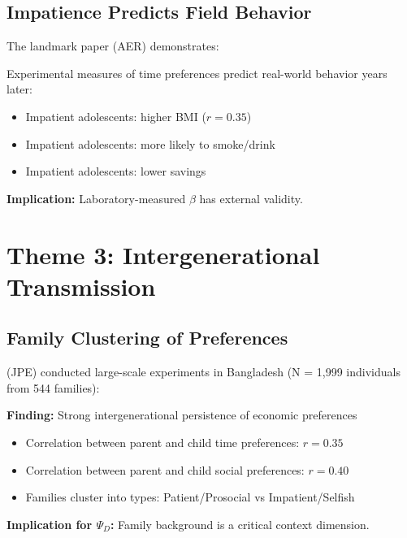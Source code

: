 \subsection{Impatience Predicts Field Behavior}

The landmark paper \citet{sutter2013impatience} (AER) demonstrates:

\begin{tcolorbox}[colback=blue!5!white, colframe=blue!75!black,
    title=Key Result SU-3: Lab-Field Validity]
Experimental measures of time preferences predict real-world behavior years later:
\begin{itemize}[nosep]
\item Impatient adolescents: higher BMI ($r = 0.35$)
\item Impatient adolescents: more likely to smoke/drink
\item Impatient adolescents: lower savings
\end{itemize}
\textbf{Implication:} Laboratory-measured $\beta$ has external validity.
\end{tcolorbox}


\section{Theme 3: Intergenerational Transmission}
\label{sec:su-intergenerational}

\subsection{Family Clustering of Preferences}

\citet{chowdhury2022preferences} (JPE) conducted large-scale experiments in Bangladesh (N = 1,999 individuals from 544 families):

\begin{tcolorbox}[colback=green!5!white, colframe=green!75!black,
    title=Key Result SU-4: Preference Heritability]
\textbf{Finding:} Strong intergenerational persistence of economic preferences
\begin{itemize}[nosep]
\item Correlation between parent and child time preferences: $r = 0.35$
\item Correlation between parent and child social preferences: $r = 0.40$
\item Families cluster into types: Patient/Prosocial vs Impatient/Selfish
\end{itemize}
\textbf{Implication for $\Psi_D$:} Family background is a critical context dimension.
\end{tcolorbox}

